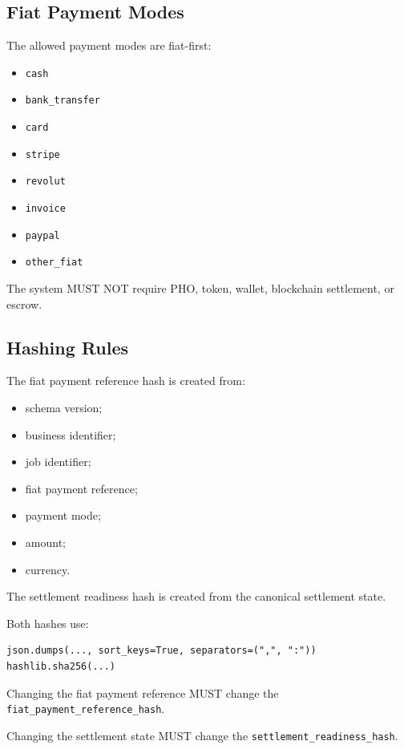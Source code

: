 \subsection{Fiat Payment Modes}

The allowed payment modes are fiat-first:

\begin{itemize}
  \item \texttt{cash}
  \item \texttt{bank\_transfer}
  \item \texttt{card}
  \item \texttt{stripe}
  \item \texttt{revolut}
  \item \texttt{invoice}
  \item \texttt{paypal}
  \item \texttt{other\_fiat}
\end{itemize}

The system MUST NOT require PHO, token, wallet, blockchain settlement, or escrow.

\subsection{Hashing Rules}

The fiat payment reference hash is created from:

\begin{itemize}
  \item schema version;
  \item business identifier;
  \item job identifier;
  \item fiat payment reference;
  \item payment mode;
  \item amount;
  \item currency.
\end{itemize}

The settlement readiness hash is created from the canonical settlement state.

Both hashes use:

\begin{verbatim}
json.dumps(..., sort_keys=True, separators=(",", ":"))
hashlib.sha256(...)
\end{verbatim}

Changing the fiat payment reference MUST change the \texttt{fiat\_payment\_reference\_hash}.

Changing the settlement state MUST change the \texttt{settlement\_readiness\_hash}.

